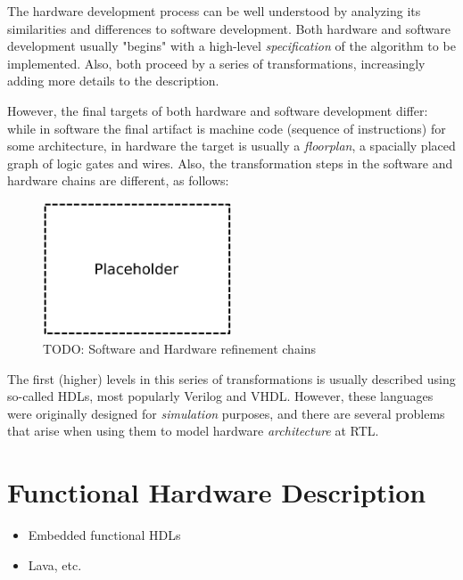 \documentclass[a4paper,draft]{report}
\begin{document}
            The hardware development process can be well understood by analyzing its
            similarities and differences to software development.
            Both hardware and software development usually "begins" with a high-level \emph{specification}
            of the algorithm to be implemented.
            Also, both proceed by a series of transformations, increasingly adding more details to the description.

            However, the final targets of both hardware and software development differ:
            while in software the final artifact is machine code (sequence of instructions) for some architecture,
            in hardware the target is usually a \emph{floorplan}, a spacially placed graph of logic gates and wires.
            Also, the transformation steps in the software and hardware chains are different, as follows:

            \begin{figure}[h]
                \centerline{\includegraphics[width=0.5\textwidth]{imgs/sw-hw-chains.pdf}}
                \caption{TODO: Software and Hardware refinement chains \label{fig:sw-hw-chains}}
            \end{figure}

            The first (higher) levels in this series of transformations is usually described using
            so-called \acp{HDL}, most popularly Verilog and VHDL.
            However, these languages were originally designed for \emph{simulation} purposes,
            and there are several problems that arise when using them to model hardware
            \emph{architecture} at \ac{RTL}.


        \section{Functional Hardware Description}
        \label{sec:functional-hardware}
            \begin{itemize}
                \item Embedded functional HDLs
                \item Lava, etc.
            \end{itemize}
\end{document}
